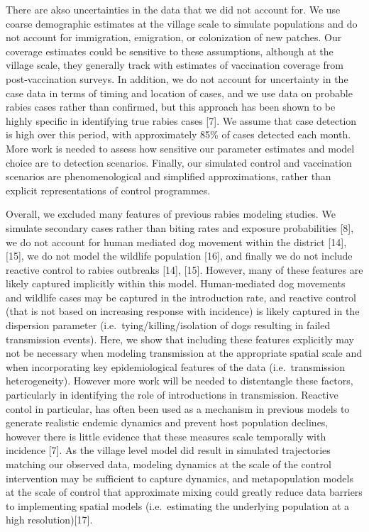 \documentclass[
]{book}
\begin{document}
There are akso uncertainties in the data that we did not account for. We use coarse demographic estimates at the village scale to simulate populations and do not account for immigration, emigration, or colonization of new patches. Our coverage estimates could be sensitive to these assumptions, although at the village scale, they generally track with estimates of vaccination coverage from post-vaccination surveys. In addition, we do not account for uncertainty in the case data in terms of timing and location of cases, and we use data on probable rabies cases rather than confirmed, but this approach has been shown to be highly specific in identifying true rabies cases {[}7{]}. We assume that case detection is high over this period, with approximately 85\% of cases detected each month. More work is needed to assess how sensitive our parameter estimates and model choice are to detection scenarios. Finally, our simulated control and vaccination scenarios are phenomenological and simplified approximations, rather than explicit representations of control programmes.

Overall, we excluded many features of previous rabies modeling studies. We simulate secondary cases rather than biting rates and exposure probabilities {[}8{]}, we do not account for human mediated dog movement within the district {[}14{]}, {[}15{]}, we do not model the wildlife population {[}16{]}, and finally we do not include reactive control to rabies outbreaks {[}14{]}, {[}15{]}. However, many of these features are likely captured implicitly within this model. Human-mediated dog movements and wildlife cases may be captured in the introduction rate, and reactive control (that is not based on increasing response with incidence) is likely captured in the dispersion parameter (i.e.~tying/killing/isolation of dogs resulting in failed transmission events). Here, we show that including these features explicitly may not be necessary when modeling transmission at the appropriate spatial scale and when incorporating key epidemiological features of the data (i.e.~transmission heterogeneity). However more work will be needed to distentangle these factors, particularly in identifying the role of introductions in transmission. Reactive contol in particular, has often been used as a mechanism in previous models to generate realistic endemic dynamics and prevent host population declines, however there is little evidence that these measures scale temporally with incidence {[}7{]}. As the village level model did result in simulated trajectories matching our observed data, modeling dynamics at the scale of the control intervention may be sufficient to capture dynamics, and metapopulation models at the scale of control that approximate mixing could greatly reduce data barriers to implementing spatial models (i.e.~estimating the underlying population at a high resolution){[}17{]}.
\end{document}
